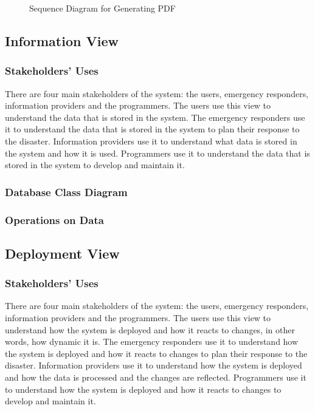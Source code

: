 \documentclass[a4paper]{article}
\begin{document}
    \begin{figure}
        
        \caption{Sequence Diagram for Generating PDF}
    \end{figure}

    \subsection{Information View}
    \subsubsection{Stakeholders' Uses}
    There are four main stakeholders of the system: the users, emergency responders, information providers and the programmers.
    The users use this view to understand the data that is stored in the system. The emergency responders use it to understand
    the data that is stored in the system to plan their response to the disaster. Information providers use it to understand
    what data is stored in the system and how it is used. Programmers use it to understand the data that is stored in the system
    to develop and maintain it.
    \subsubsection{Database Class Diagram}
    \subsubsection{Operations on Data}
    \lipsum[1-1] %
    \subsection{Deployment View}
    \subsubsection{Stakeholders' Uses}
    There are four main stakeholders of the system: the users, emergency responders, information providers and the programmers.
    The users use this view to understand how the system is deployed and how it reacts to changes, in other words, how dynamic it is.
    The emergency responders use it to understand how the system is deployed and how it reacts to changes to plan their response
    to the disaster. Information providers use it to understand how the system is deployed and how the data is processed and the
    changes are reflected. Programmers use it to understand how the system is deployed and how it reacts to changes to develop
    and maintain it.
\end{document}
